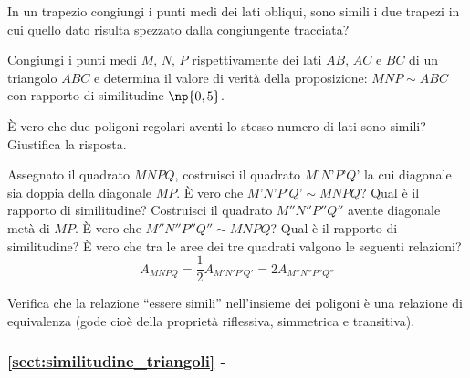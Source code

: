 \begin{multicols}{2}

\begin{esercizio}
\label{ese:6.51}
In un trapezio congiungi i punti medi dei lati obliqui, sono simili i 
due trapezi in cui quello dato risulta spezzato dalla congiungente 
tracciata? 
\end{esercizio}

\begin{esercizio}
\label{ese:6.52}
Congiungi i punti medi $M$, $N$, $P$ rispettivamente dei lati $AB$, 
$AC$ e $BC$ di un triangolo $ABC$ e determina il valore di verità 
della proposizione: $MNP\sim ABC$ con rapporto di similitudine 
$\np{0,5}$.
\end{esercizio}

\begin{esercizio}
\label{ese:6.53}
È vero che due poligoni regolari aventi lo stesso numero di lati 
sono simili? Giustifica la risposta.
\end{esercizio}

\begin{esercizio}
\label{ese:6.54}
Assegnato il quadrato $MNPQ$, costruisci il quadrato $M’N’P’Q’$ la 
cui diagonale sia doppia della diagonale $MP$. È vero che 
$M’N’P’Q’\sim MNPQ$? Qual è il rapporto di similitudine? Costruisci 
il quadrato $M''N''P''Q''$ avente diagonale metà di $MP$. È vero 
che $M''N''P''Q''\sim MNPQ$? Qual è il rapporto di similitudine? È 
vero che tra le aree dei tre quadrati valgono le seguenti relazioni?
\[A_{MNPQ}=\frac{1}{2}A_{M'N'P'Q'}=2A_{M''N''P''Q''} \]
\end{esercizio}

\begin{esercizio}
\label{ese:6.55}
Verifica che la relazione ``essere simili'' nell'insieme dei poligoni 
è una relazione di equivalenza (gode cioè della proprietà riflessiva, 
simmetrica e transitiva).
\end{esercizio}

\end{multicols}

\begingroup
\hypersetup{linkcolor=black}
\subsubsection*{\ref{sect:similitudine_triangoli} - 
}
\endgroup

